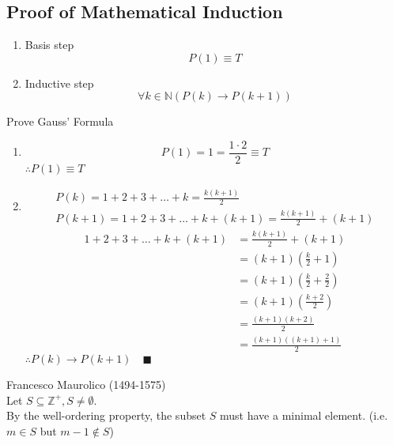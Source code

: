 \documentclass[letterpaper, 12pt]{article}
\newenvironment{proof}[1][Proof]{\begin{trivlist}
\item[\hskip \labelsep {\bfseries #1}]}{\end{trivlist}}
\newenvironment{example}[1][Example]{\begin{trivlist}
\item[\hskip \labelsep {\bfseries #1}]}{\end{trivlist}}
\newcommand{\qed}{\quad \blacksquare}
\newcommand{\then}{\rightarrow}
\newcommand{\N}{\mathbb{N}}
\newcommand{\Z}{\mathbb{Z}}
\newcommand{\0}{\emptyset}
\begin{document}
    \subsection*{Proof of Mathematical Induction}
    \begin{enumerate}
        \item Basis step
        \[P(1) \equiv T\]
        \item Inductive step
        \[\forall k \in \N (P(k) \then P(k + 1))\]
    \end{enumerate}
    \begin{example}
        Prove Gauss' Formula
        \begin{proof}
            \begin{enumerate}
                \item \[P(1) = 1 = \frac{1 \cdot 2}{2} \equiv T\]
                $\therefore P(1) \equiv T$
                \item
                \begin{gather*}
                    P(k) = 1 + 2 + 3 + \dots + k = \frac{k(k + 1)}{2} \\
                    P(k + 1) = 1 + 2 + 3 + \dots + k + (k + 1) = \frac{k(k + 1)}{2} + (k + 1)
                \end{gather*}
                \begin{align*}
                    1 + 2 + 3 + \dots + k + (k + 1) &= \frac{k(k + 1)}{2} + (k + 1) \\
                    &= (k + 1)\left(\frac{k}{2} + 1\right) \\
                    &= (k + 1)\left(\frac{k}{2} + \frac{2}{2}\right) \\
                    &= (k + 1)\left(\frac{k + 2}{2}\right) \\
                    &= \frac{(k + 1)(k + 2)}{2} \\
                    &= \frac{(k + 1)((k + 1) + 1)}{2}
                \end{align*}
                $\therefore P(k) \then P(k + 1) \qed$
            \end{enumerate}
        \end{proof}
    \end{example}
    Francesco Maurolico (1494-1575) \\
    Let $S \subseteq \Z^+, S \ne \0$. \\
    By the well-ordering property, the subset $S$ must have a minimal element. 
    (i.e. $m \in S$ but $m-1 \notin S$) \\
\end{document}
